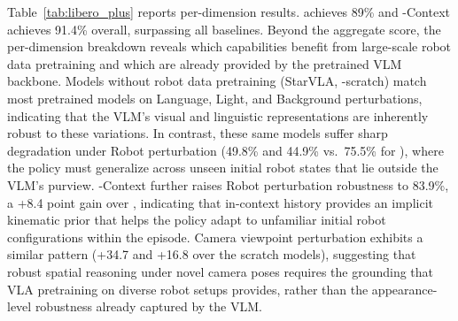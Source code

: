 Table~\ref{tab:libero_plus} reports per-dimension results. \ours achieves 89\% and \ours-Context achieves 91.4\% overall, surpassing all baselines. Beyond the aggregate score, the per-dimension breakdown reveals which capabilities benefit from large-scale robot data pretraining and which are already provided by the pretrained VLM backbone. Models without robot data pretraining (StarVLA, \ours-scratch) match most pretrained models on Language, Light, and Background perturbations, indicating that the VLM's visual and linguistic representations are inherently robust to these variations. In contrast, these same models suffer sharp degradation under Robot perturbation (49.8\% and 44.9\% vs.\ 75.5\% for \ours), where the policy must generalize across unseen initial robot states that lie outside the VLM's purview. 
\ours-Context further raises Robot perturbation robustness to 83.9\%, a +8.4 point gain over \ours, indicating that in-context history provides an implicit kinematic prior that helps the policy adapt to unfamiliar initial robot configurations within the episode.
Camera viewpoint perturbation exhibits a similar pattern (+34.7 and +16.8 over the scratch models), suggesting that robust spatial reasoning under novel camera poses requires the grounding that VLA pretraining on diverse robot setups provides, rather than the appearance-level robustness already captured by the VLM.

